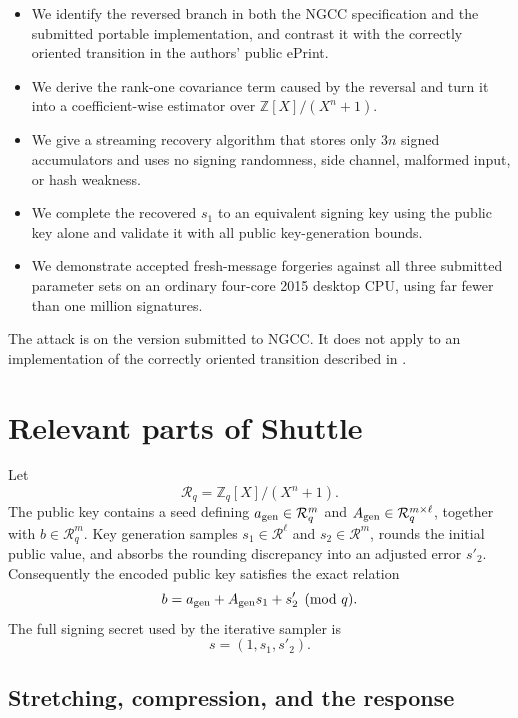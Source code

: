 \documentclass[11pt,a4paper]{article}
\newcommand{\Z}{\mathbb{Z}}
\newcommand{\R}{\mathcal{R}}
\begin{document}
\begin{itemize}[leftmargin=1.5em]
  \item We identify the reversed branch in both the NGCC specification and
        the submitted portable implementation, and contrast it with the
        correctly oriented transition in the authors' public ePrint.
  \item We derive the rank-one covariance term caused by the reversal and
        turn it into a coefficient-wise estimator over
        $\Z[X]/(X^n+1)$.
  \item We give a streaming recovery algorithm that stores only $3n$
        signed accumulators and uses no signing randomness, side channel,
        malformed input, or hash weakness.
  \item We complete the recovered $s_1$ to an equivalent signing key using
        the public key alone and validate it with all public key-generation
        bounds.
  \item We demonstrate accepted fresh-message forgeries against all three
        submitted parameter sets on an ordinary four-core 2015 desktop CPU,
        using far fewer than one million signatures.
\end{itemize}

The attack is on the version submitted to NGCC.  It does not apply to an
implementation of the correctly oriented transition described in
\cite{MingEtAl}.

\section{Relevant parts of Shuttle}
\label{sec:scheme}

Let
\[
       \R_q=\Z_q[X]/(X^n+1).
\]
The public key contains a seed defining
$a_{\rm gen}\in\R_q^m$ and
$A_{\rm gen}\in\R_q^{m\times\ell}$, together with
$b\in\R_q^m$.  Key generation samples
$s_1\in\R^\ell$ and $s_2\in\R^m$, rounds the initial public value, and absorbs
the rounding discrepancy into an adjusted error $s'_2$.  Consequently the
encoded public key satisfies the exact relation
\begin{equation}
       b=a_{\rm gen}+A_{\rm gen}s_1+s'_2\pmod q.
\label{eq:pkrelation}
\end{equation}
The full signing secret used by the iterative sampler is
\[
                         s=(1,s_1,s'_2).
\]

\subsection{Stretching, compression, and the response}
\end{document}
